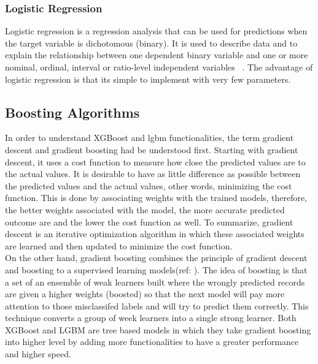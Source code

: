 \documentclass[journal,twoside,web]{ieeecolor}
\begin{document}
                        
\subsubsection{Logistic Regression}
Logistic regression is a regression analysis that can be used for predictions when the target variable is dichotomous (binary). It is used to describe data and to explain the relationship between one dependent binary variable and one or more nominal, ordinal, interval or ratio-level independent variables ~\cite{statisticssolutions}. The advantage of logistic regression is that its simple to implement with very few parameters.

\subsection{Boosting Algorithms}
In order to understand XGBoost and lgbm functionalities, the term gradient descent and gradient boosting had be understood first. 
Starting with gradient descent, it uses a cost function to measure how close the predicted values are to the actual values. It is desirable to have as little difference as possible between the predicted values and the actual values, other words, minimizing the cost function. This is done by associating weights with the trained models, therefore, the better weights associated with the model, the more accurate predicted outcome are and the lower the cost function as well. To summarize, gradient descent is an iterative optimization algorithm in which these associated weights are learned and then updated to minimize the cost function. \\
On the other hand, gradient boosting combines the principle of gradient descent and boosting to a supervised learning models(ref: ). The idea of boosting is that a set of an ensemble of weak learners built where the wrongly predicted records are given a higher weights (boosted) so that the next model will pay more attention to those misclassifed labels and will try to predict them correctly. This technique converts a group of week learners into a single strong learner. Both XGBoost and LGBM are tree based models in which they take gradient boosting into higher level by adding more functionalities to have a greater performance and higher speed. 
\end{document}
